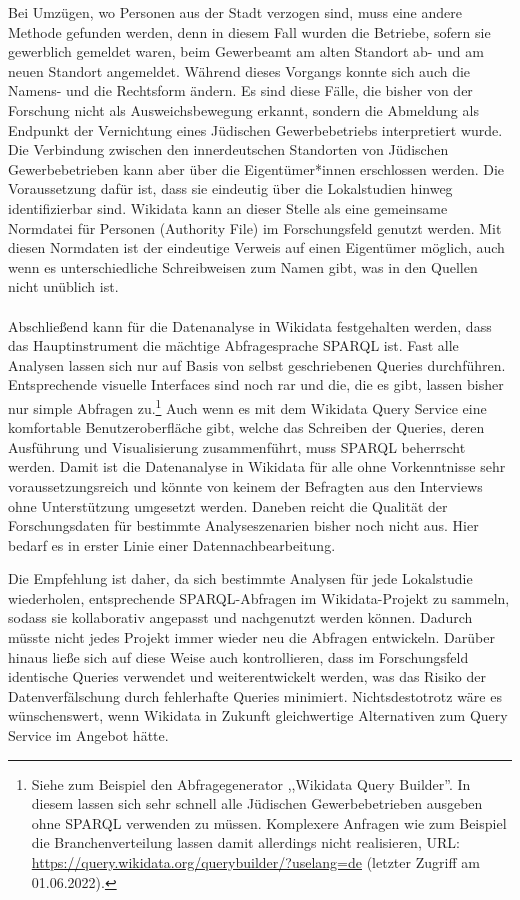 Bei Umzügen, wo Personen aus der Stadt verzogen sind, muss eine andere Methode gefunden werden, denn in diesem Fall wurden die Betriebe, sofern sie gewerblich gemeldet waren, beim Gewerbeamt am alten Standort ab- und am neuen Standort angemeldet. Während dieses Vorgangs konnte sich auch die Namens- und die Rechtsform ändern. Es sind diese Fälle, die bisher von der Forschung nicht als Ausweichsbewegung erkannt, sondern die Abmeldung als Endpunkt der Vernichtung eines Jüdischen Gewerbebetriebs interpretiert wurde. Die Verbindung zwischen den innerdeutschen Standorten von Jüdischen Gewerbebetrieben kann aber über die Eigentümer*innen erschlossen werden. Die Voraussetzung dafür ist, dass sie eindeutig über die Lokalstudien hinweg identifizierbar sind. Wikidata kann an dieser Stelle als eine gemeinsame Normdatei für Personen (Authority File) im Forschungsfeld genutzt werden. Mit diesen Normdaten ist der eindeutige Verweis auf einen Eigentümer möglich, auch wenn es unterschiedliche Schreibweisen zum Namen gibt, was in den Quellen nicht unüblich ist. \\ \\
Abschließend kann für die Datenanalyse in Wikidata festgehalten werden, dass das Hauptinstrument die mächtige Abfragesprache SPARQL ist. Fast alle Analysen lassen sich nur auf Basis von selbst geschriebenen Queries durchführen. Entsprechende visuelle Interfaces sind noch rar und die, die es gibt, lassen bisher nur simple Abfragen zu.\footnote{Siehe zum Beispiel den Abfragegenerator ,,Wikidata Query Builder''. In diesem lassen sich sehr schnell alle Jüdischen Gewerbebetrieben ausgeben ohne SPARQL verwenden zu müssen. Komplexere Anfragen wie zum Beispiel die Branchenverteilung lassen damit allerdings nicht realisieren, URL: \url{https://query.wikidata.org/querybuilder/?uselang=de} (letzter Zugriff am 01.06.2022).} Auch wenn es mit dem Wikidata Query Service eine komfortable Benutzeroberfläche gibt, welche das Schreiben der Queries, deren Ausführung und Visualisierung zusammenführt, muss SPARQL beherrscht werden. Damit ist die Datenanalyse in Wikidata für alle ohne Vorkenntnisse sehr voraussetzungsreich und könnte von keinem der Befragten aus den Interviews ohne Unterstützung umgesetzt werden. Daneben reicht die Qualität der Forschungsdaten für bestimmte Analyseszenarien bisher noch nicht aus. Hier bedarf es in erster Linie einer Datennachbearbeitung.

Die Empfehlung ist daher, da sich bestimmte Analysen für jede Lokalstudie wiederholen, entsprechende SPARQL-Abfragen im Wikidata-Projekt zu sammeln, sodass sie kollaborativ angepasst und nachgenutzt werden können. Dadurch müsste nicht jedes Projekt immer wieder neu die Abfragen entwickeln. Darüber hinaus ließe sich auf diese Weise auch kontrollieren, dass im Forschungsfeld identische Queries verwendet und weiterentwickelt werden, was das Risiko der Datenverfälschung durch fehlerhafte Queries minimiert. Nichtsdestotrotz wäre es wünschenswert, wenn Wikidata in Zukunft gleichwertige Alternativen zum Query Service im Angebot hätte.
  
